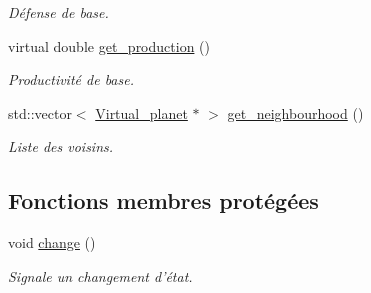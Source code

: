 \begin{DoxyCompactItemize}
\begin{DoxyCompactList}\small\item\em Défense de base. \end{DoxyCompactList}\item 
\hypertarget{classVirtual__planet_a4294d3312671d720dca0b72a1648e6a4}{virtual double \hyperlink{classVirtual__planet_a4294d3312671d720dca0b72a1648e6a4}{get\-\_\-production} ()}\label{classVirtual__planet_a4294d3312671d720dca0b72a1648e6a4}

\begin{DoxyCompactList}\small\item\em Productivité de base. \end{DoxyCompactList}\item 
\hypertarget{classVirtual__planet_a996699dcad7e99262842e06079896ed1}{std\-::vector$<$ \hyperlink{classVirtual__planet}{Virtual\-\_\-planet} $\ast$ $>$ \hyperlink{classVirtual__planet_a996699dcad7e99262842e06079896ed1}{get\-\_\-neighbourhood} ()}\label{classVirtual__planet_a996699dcad7e99262842e06079896ed1}

\begin{DoxyCompactList}\small\item\em Liste des voisins. \end{DoxyCompactList}\end{DoxyCompactItemize}
\subsection*{Fonctions membres protégées}
\begin{DoxyCompactItemize}
\item 
\hypertarget{classVirtual__planet_a9c79d42a13bb25243354faf9895aca14}{void \hyperlink{classVirtual__planet_a9c79d42a13bb25243354faf9895aca14}{change} ()}\label{classVirtual__planet_a9c79d42a13bb25243354faf9895aca14}

\begin{DoxyCompactList}\small\item\em Signale un changement d'état. \end{DoxyCompactList}\end{DoxyCompactItemize}
